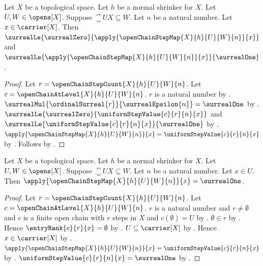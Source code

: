 \begin{corollary}\label{open_chain_step_map_between_zero_and_one}
    Let $X$ be a topological space.
    Let $h$ be a normal shrinker for $X$.
    Let $U,W\in\opens[X]$.
    Suppose $\closure{U}{X}\subseteq W$.
    Let $n$ be a natural number.
    Let $x\in\carrier[X]$.
    Then
        $\surrealLe{\surrealZero}
            {\apply{\openChainStepMap{X}{h}{U}{W}{n}}{x}}$ and
        $\surrealLe{\apply{\openChainStepMap{X}{h}{U}{W}{n}}{x}}
            {\surrealOne}$.
\end{corollary}
\begin{proof}
    Let $r=\openChainStepCount{X}{h}{U}{W}{n}$.
    Let $c=\openChainAtLevel{X}{h}{U}{W}{n}$.
    $r$ is a natural number by .
    $\surrealMul{\ordinalSurreal{r}}{\surrealEpsilon{n}}
        =\surrealOne$ by .
    $\surrealLe{\surrealZero}{\uniformStepValue{c}{r}{n}{x}}$ and
        $\surrealLe{\uniformStepValue{c}{r}{n}{x}}{\surrealOne}$
        by .
    $\apply{\openChainStepMap{X}{h}{U}{W}{n}}{x}
        =\uniformStepValue{c}{r}{n}{x}$
        by .
    Follows by \auto.
\end{proof}

\begin{proposition}\label{open_chain_step_map_one_on_first}
    Let $X$ be a topological space.
    Let $h$ be a normal shrinker for $X$.
    Let $U,W\in\opens[X]$.
    Suppose $\closure{U}{X}\subseteq W$.
    Let $n$ be a natural number.
    Let $x\in U$.
    Then $\apply{\openChainStepMap{X}{h}{U}{W}{n}}{x}=\surrealOne$.
\end{proposition}
\begin{proof}
    Let $r=\openChainStepCount{X}{h}{U}{W}{n}$.
    Let $c=\openChainAtLevel{X}{h}{U}{W}{n}$.
    $r$ is a natural number and $r\neq\emptyset$ and
        $c$ is a finite open chain with $r$ steps in $X$ and
        $c(\emptyset)=U$
        by .
    $\emptyset\in r$ by .
    Hence $\entryRank{c}{r}{x}=\emptyset$
        by .
    $U\subseteq\carrier[X]$ by .
    Hence $x\in\carrier[X]$ by .
    $\apply{\openChainStepMap{X}{h}{U}{W}{n}}{x}
        =\uniformStepValue{c}{r}{n}{x}$
        by .
    $\uniformStepValue{c}{r}{n}{x}=\surrealOne$
        by .
\end{proof}

